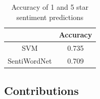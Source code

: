 \documentclass{acm_proc_article-sp}
\begin{document}
\begin{table}
\centering
\caption{Accuracy of 1 and 5 star sentiment predictions}
\begin{tabular}{|c|c|}
\hline
& \textbf{Accuracy} \\ \hline
SVM & 0.735 \\ \hline
SentiWordNet & 0.709 \\ \hline
\end{tabular}
\end{table}

\subsection{Contributions}



\balancecolumns
\end{document}
